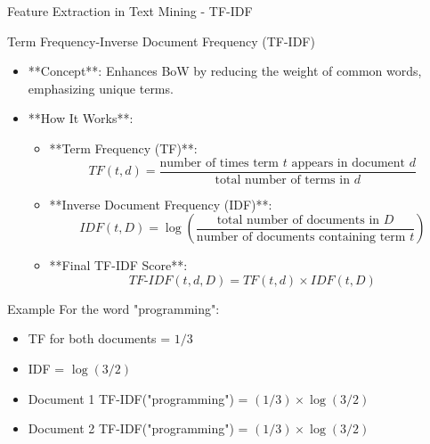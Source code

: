 \documentclass[aspectratio=169]{beamer}
\begin{document}
\begin{frame}[fragile]{Feature Extraction in Text Mining - TF-IDF}
  \begin{block}{Term Frequency-Inverse Document Frequency (TF-IDF)}
    \begin{itemize}
      \item **Concept**: Enhances BoW by reducing the weight of common words, emphasizing unique terms.
      \item **How It Works**:
      \begin{itemize}
        \item **Term Frequency (TF)**:
          \[
          TF(t, d) = \frac{\text{number of times term } t \text{ appears in document } d}{\text{total number of terms in } d}
          \]
        \item **Inverse Document Frequency (IDF)**:
          \[
          IDF(t, D) = \log\left(\frac{\text{total number of documents in } D}{\text{number of documents containing term } t}\right)
          \]
        \item **Final TF-IDF Score**:
          \[
          TF\text{-}IDF(t, d, D) = TF(t, d) \times IDF(t, D)
          \]
      \end{itemize}
    \end{itemize}
  \end{block}

  \begin{block}{Example}
    For the word "programming":
    \begin{itemize}
      \item TF for both documents = \(1/3\)
      \item IDF = \(\log(3/2)\)
    \end{itemize}
    
    \begin{itemize}
      \item Document 1 TF-IDF("programming") = \((1/3) \times \log(3/2)\)
      \item Document 2 TF-IDF("programming") = \((1/3) \times \log(3/2)\)
    \end{itemize}
  \end{block}
\end{frame}
\end{document}
